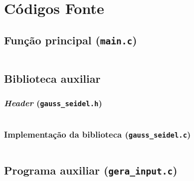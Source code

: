 \section{Códigos Fonte}

	\subsection{Função principal (\texttt{main.c})}
		\inputminted[autogobble,breaklines,linenos,frame=lines,tabsize=4,obeytabs=true,fontsize=\footnotesize
		]{c}{source_codes/main.c}
		\label{lst:main.c}

	\subsection{Biblioteca auxiliar}
		\subsubsection{\emph{Header} (\texttt{gauss\_seidel.h})}
			\inputminted[autogobble,breaklines,linenos,frame=lines,tabsize=4,obeytabs=true,fontsize=\footnotesize
			]{c}{source_codes/gauss_seidel.h}
			\label{lst:gauss_seidel.h}

		\subsubsection{Implementação da biblioteca (\texttt{gauss\_seidel.c})}
			\inputminted[autogobble,breaklines,linenos,frame=lines,tabsize=4,obeytabs=true,fontsize=\footnotesize
			]{c}{source_codes/gauss_seidel.c}
			\label{lst:gauss_seidel.c}

	\subsection{Programa auxiliar (\texttt{gera\_input.c})}
		\inputminted[autogobble,breaklines,linenos,frame=lines,tabsize=4,obeytabs=true,fontsize=\footnotesize
			]{c}{source_codes/gera_input.c}
			\label{lst:gera_input.c}